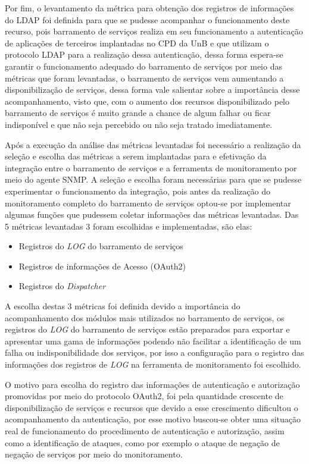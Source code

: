 Por fim, o levantamento da métrica para obtenção dos registros de informações do LDAP foi definida para que se pudesse acompanhar o funcionamento deste recurso, pois barramento de serviços realiza em seu funcionamento a autenticação de aplicações de terceiros implantadas no CPD da UnB e que utilizam o protocolo LDAP para a realização dessa autenticação, dessa forma espera-se garantir o funcionamento adequado do barramento de serviços por meio das métricas que foram levantadas, o barramento de serviços vem aumentando a disponibilização de serviços, dessa forma vale salientar sobre a importância desse acompanhamento, visto que, com o aumento dos recursos disponibilizado pelo barramento de serviços é muito grande a chance de algum falhar ou ficar indisponível e que não seja percebido ou não seja tratado imediatamente.  

Após a execução da análise das métricas levantadas foi necessário a realização da seleção e escolha das métricas a serem implantadas para e efetivação da integração entre o barramento de serviços e a ferramenta de monitoramento por meio do agente \acrshort{SNMP}. A seleção e escolha foram necessárias para que se pudesse experimentar o funcionamento da integração, pois antes da realização do monitoramento completo do barramento de serviços optou-se por implementar algumas funções que pudessem coletar informações das métricas levantadas. Das 5 métricas levantadas 3 foram escolhidas e implementadas, são elas: 

\begin{itemize}
    \item Registros do \textit{LOG} do barramento de serviços
    \item Registros de informações de Acesso (OAuth2)
    \item Registros do \textit{Dispatcher}
\end{itemize}

A escolha destas 3 métricas foi definida devido a importância do acompanhamento dos módulos mais utilizados no barramento de serviços, os registros do \textit{LOG} do barramento de serviços estão preparados para exportar e apresentar uma gama de informações podendo não facilitar a identificação de um falha ou indisponibilidade dos serviços, por isso a configuração para o registro das informações dos registros de \textit{LOG} na ferramenta de monitoramento foi escolhido. 

O motivo para escolha do registro das informações de autenticação e autorização promovidas por meio do protocolo OAuth2, foi pela quantidade crescente de disponibilização de serviços e recursos que devido a esse crescimento dificultou o acompanhamento da autenticação, por esse motivo buscou-se obter uma situação real de funcionamento do procedimento de autenticação e autorização, assim como a identificação de ataques, como por exemplo o ataque de negação de negação de serviços por meio do monitoramento. 

